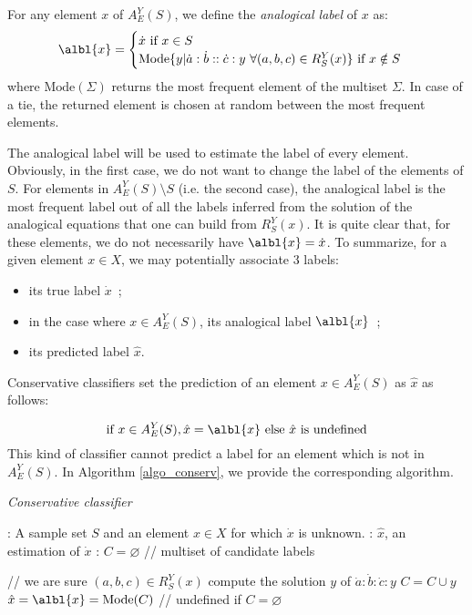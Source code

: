 \documentclass{ecai}
\begin{document}
For any element $x$ of $A_E^Y(S)$, we define the \textit{analogical label} of
$x$ as:
$$\albl{x} = \begin{cases}
\dot{x} \text{ if } x \in S\\
\text{Mode} \{y | \dot{a} : \dot{b} :: \dot{c} : y ~ \forall (a, b, c) \in
R_S^Y(x) \} \text{ if } x \notin S
\end{cases}
$$
where $\text{Mode}(\Sigma)$ returns the most frequent element of the multiset
$\Sigma$. In case of a tie, the returned element is chosen at random between
the most frequent elements.

The analogical label will be used to estimate the label of every element.
Obviously, in the first case, we do not want to change the label of the
elements of $S$.  For elements in $A_E^Y(S) \setminus S$ (i.e.  the second
case), the analogical label is the most frequent label out of all the labels inferred from the
solution of the analogical equations that one can build from $R_S^Y(x)$.  It is
quite clear that, for these elements,  we do not necessarily have
$\albl{x}=\dot{x}$.  To summarize, for a given element $x \in X$, we may 
potentially associate 3 labels:
\begin{itemize}
\item its true label $\dot{x}$~;
\item in the case where $x \in A_E^Y(S)$, its analogical label $\albl{x}$~;
\item its predicted label $\hat{x}$.
\end{itemize}
\noindent
Conservative classifiers set the prediction of an element $x \in A_E^Y(S)$ as
$\hat{x}$ as follows:

$$\mbox{if } x \in A_E^Y(S),  \hat{x} = \albl{x} \mbox{ else } \hat{x} \mbox{ is undefined}$$
This kind of classifier cannot predict a label for an element which is not in $A_E^Y(S)$.
In Algorithm \ref{algo_conserv}, we provide the corresponding algorithm.

\begin{algorithm}[!ht]
 \caption{\textit{Conservative classifier}}
       \label{algo_conserv}
       \begin{algorithmic}

      : A sample set $S$ and an element $x \in X$ for which
      $\dot{x}$ is unknown.
      : $\hat{x}$, an estimation of $\dot{x}$
      : $C = \varnothing$ \quad \quad // multiset of candidate labels

      \STATE // we are sure $(a, b, c) \in R_S^Y(x)$
      \STATE compute the solution $y$ of $\dot{a} : \dot{b} : \dot{c} : y$
      \STATE $ C = C \cup y$
      \ENDIF
	    \ENDFOR
      \STATE $\hat{x} = \albl{x}  = \text{Mode} (C)$ // undefined if $C = \varnothing$
\end{algorithmic}
\end{algorithm}
\end{document}
